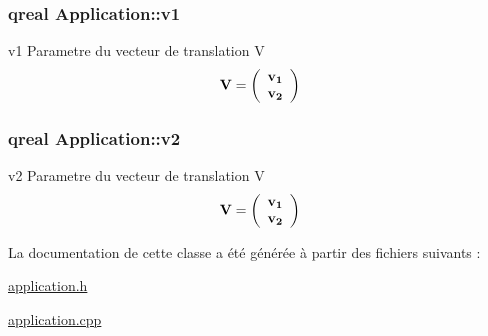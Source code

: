 \hypertarget{class_application_aec5855e0925af60f70007a7836883372}{}
\subsubsection[{v1}]{\setlength{\rightskip}{0pt plus 5cm}qreal Application\+::v1\hspace{0.3cm}{\ttfamily [protected]}}\label{class_application_aec5855e0925af60f70007a7836883372}


v1 Parametre du vecteur de translation V \[\bf V\bf= \bf\left( \begin{array}{ccc} \bf v_{1}\\ \bf v_{2}\\ \end{array} \bf\right) \] 

\hypertarget{class_application_a4d636adf2cd2c6139f94ddce0fae375b}{}
\subsubsection[{v2}]{\setlength{\rightskip}{0pt plus 5cm}qreal Application\+::v2\hspace{0.3cm}{\ttfamily [protected]}}\label{class_application_a4d636adf2cd2c6139f94ddce0fae375b}


v2 Parametre du vecteur de translation V \[\bf V\bf= \bf\left( \begin{array}{ccc} \bf v_{1}\\ \bf v_{2}\\ \end{array} \bf\right) \] 



La documentation de cette classe a été générée à partir des fichiers suivants \+:\begin{DoxyCompactItemize}
\item 
\hyperlink{application_8h}{application.\+h}\item 
\hyperlink{application_8cpp}{application.\+cpp}\end{DoxyCompactItemize}

